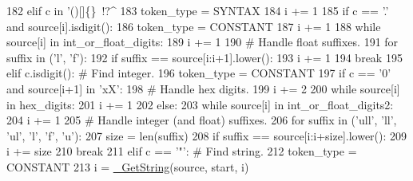\begin{DoxyCode}
182         \textcolor{keywordflow}{elif} c \textcolor{keywordflow}{in} \textcolor{stringliteral}{'()[]\{\}~!?^%
183             token\_type = SYNTAX
184             i += 1
185             \textcolor{keywordflow}{if} c == \textcolor{stringliteral}{'.'} \textcolor{keywordflow}{and} source[i].isdigit():
186                 token\_type = CONSTANT
187                 i += 1
188                 \textcolor{keywordflow}{while} source[i] \textcolor{keywordflow}{in} int\_or\_float\_digits:
189                     i += 1
190                 \textcolor{comment}{# Handle float suffixes.}
191                 \textcolor{keywordflow}{for} suffix \textcolor{keywordflow}{in} (\textcolor{stringliteral}{'l'}, \textcolor{stringliteral}{'f'}):
192                     \textcolor{keywordflow}{if} suffix == source[i:i+1].lower():
193                         i += 1
194                         \textcolor{keywordflow}{break}
195         \textcolor{keywordflow}{elif} c.isdigit():                        \textcolor{comment}{# Find integer.}
196             token\_type = CONSTANT
197             \textcolor{keywordflow}{if} c == \textcolor{stringliteral}{'0'} \textcolor{keywordflow}{and} source[i+1] \textcolor{keywordflow}{in} \textcolor{stringliteral}{'xX'}:
198                 \textcolor{comment}{# Handle hex digits.}
199                 i += 2
200                 \textcolor{keywordflow}{while} source[i] \textcolor{keywordflow}{in} hex\_digits:
201                     i += 1
202             \textcolor{keywordflow}{else}:
203                 \textcolor{keywordflow}{while} source[i] \textcolor{keywordflow}{in} int\_or\_float\_digits2:
204                     i += 1
205             \textcolor{comment}{# Handle integer (and float) suffixes.}
206             \textcolor{keywordflow}{for} suffix \textcolor{keywordflow}{in} (\textcolor{stringliteral}{'ull'}, \textcolor{stringliteral}{'ll'}, \textcolor{stringliteral}{'ul'}, \textcolor{stringliteral}{'l'}, \textcolor{stringliteral}{'f'}, \textcolor{stringliteral}{'u'):}
207 \textcolor{stringliteral}{                size = len(suffix)}
208 \textcolor{stringliteral}{                }\textcolor{keywordflow}{if} suffix == source[i:i+size].lower():
209                     i += size
210                     \textcolor{keywordflow}{break}
211         \textcolor{keywordflow}{elif} c == \textcolor{stringliteral}{'"'}:                           \textcolor{comment}{# Find string.}
212             token\_type = CONSTANT
213             i = \hyperlink{namespacecpp_1_1tokenize_a3c6a8b154110b4b6a0385ccc3469db77}{\_GetString}(source, start, i)
}
\end{DoxyCode}
